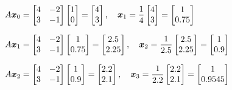 \begin{solution}[3.6cm]
\(\displaystyle
A\boldsymbol{x}_0 = \begin{bmatrix}4&-2\\3&-1\end{bmatrix}
\begin{bmatrix}1\\0\end{bmatrix}=\begin{bmatrix}4\\3\end{bmatrix},
\quad \boldsymbol{x}_1 = \frac14 \begin{bmatrix}4\\3\end{bmatrix}=\begin{bmatrix}1\\0.75\end{bmatrix}\)

\smallskip \noindent
\(\displaystyle
A\boldsymbol{x}_1=\begin{bmatrix}4&-2\\3&-1\end{bmatrix}\begin{bmatrix}1\\0.75\end{bmatrix}
=\begin{bmatrix}2.5\\2.25\end{bmatrix},
\quad \boldsymbol{x}_2 = \frac1{2.5}\begin{bmatrix}2.5\\2.25\end{bmatrix} = \begin{bmatrix}1\\0.9\end{bmatrix}\)

\smallskip \noindent
\(\displaystyle
A\boldsymbol{x}_2=\begin{bmatrix}4&-2\\3&-1\end{bmatrix}\begin{bmatrix}1\\0.9\end{bmatrix}
=\begin{bmatrix}2.2\\2.1\end{bmatrix},
\quad \boldsymbol{x}_3 = \frac1{2.2}\begin{bmatrix}2.2\\2.1\end{bmatrix} = \begin{bmatrix}1\\0.9545\end{bmatrix}\)


\end{solution}
